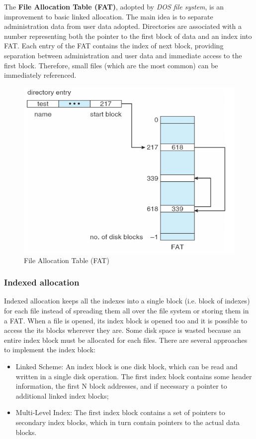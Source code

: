 \documentclass{report}
\begin{document}
The \textbf{File Allocation Table (FAT)}, adopted by \emph{DOS file system}, is an improvement to basic linked allocation. The main idea is to separate administration data from user data adopted. Directories are associated with a number representing both the pointer to the first block of data and an index into FAT. Each entry of the FAT contains the index of next block, providing separation between administration and user data and immediate access to the first block. Therefore, small files (which are the most common) can be immediately referenced.

\begin{figure}[hbtp]
\centering
\includegraphics[scale=0.35]{images/file_system/fat.png}
\caption{File Allocation Table (FAT)}
\end{figure}

\subsubsection{Indexed allocation}
Indexed allocation keeps all the indexes into a single block (i.e. block of indexes) for each file instead of spreading them all over the file system or storing them in a FAT. When a file is opened, its index block is opened too and it is possible to access the its blocks wherever they are. Some disk space is wasted because an entire index block must be allocated for each files. There are several approaches to implement the index block:
\begin{itemize}
\item Linked Scheme: An index block is one disk block, which can be read and written in a single disk operation. The first index block contains some header information, the first N block addresses, and if necessary a pointer to additional linked index blocks;
\item Multi-Level Index: The first index block contains a set of pointers to secondary index blocks, which in turn contain pointers to the actual data blocks.
\end{itemize}
\end{document}
